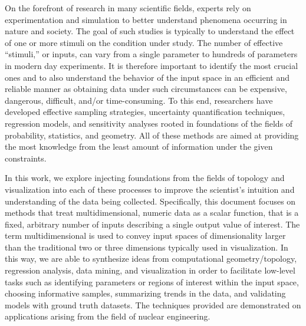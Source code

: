 
On the forefront of research in many scientific fields, experts rely on experimentation and simulation to better understand phenomena occurring in nature and society.
%
The goal of such studies is typically to understand the effect of one or more stimuli on the condition under study.
%
The number of effective ``stimuli,'' or inputs, can vary from a single parameter to hundreds of parameters in modern day experiments.
%
It is therefore important to identify the most crucial ones and to also understand the behavior of the input space in an efficient and reliable manner as obtaining data under such circumstances can be expensive, dangerous, difficult, and/or time-consuming.
%
To this end, researchers have developed effective sampling strategies, uncertainty quantification techniques, regression models, and sensitivity analyses rooted in foundations of the fields of probability, statistics, and geometry.
%
All of these methods are aimed at providing the most knowledge from the least amount of information under the given constraints.

In this work, we explore injecting foundations from the fields of topology and visualization into each of these processes to improve the scientist's intuition and understanding of the data being collected.
%
Specifically, this document focuses on methods that treat multidimensional, numeric data as a scalar function, that is a fixed, arbitrary number of inputs describing a single output value of interest.
%
The term multidimensional is used to convey input spaces of dimensionality larger than the traditional two or three dimensions typically used in visualization.
%
In this way, we are able to synthesize ideas from computational geometry/topology, regression analysis, data mining, and visualization in order to facilitate low-level tasks such as identifying parameters or regions of interest within the input space, choosing informative samples, summarizing trends in the data, and validating models with ground truth datasets.
%
The techniques provided are demonstrated on applications arising from the field of nuclear engineering.

